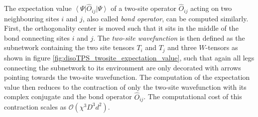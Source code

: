 The expectation value $\left\langle\Psi\right|\hat{O}_{ij}\left|\Psi\right\rangle$ of a two-site operator $\hat{O}_{ij}$ acting on two neighbouring sites $i$ and $j$, also called \textit{bond operator}, can be computed similarly. First, the orthogonality center is moved such that it sits in the middle of the bond connecting sites $i$ and $j$. The \textit{two-site wavefunction} is then defined as the subnetwork containing the two site tensors $T_i$ and $T_j$ and three $W$-tensors as shown in figure \ref{fig:disoTPS_twosite_expectation_value}, such that again all legs connecting the subnetwork to its environment are only decorated with arrows pointing towards the two-site wavefunction. The computation of the expectation value then reduces to the contraction of only the two-site wavefunction with its complex conjugate and the bond operator $\hat{O}_{ij}$. The computational cost of this contraction scales as $\mathcal{O}\left(\chi^3D^3d^2\right)$.